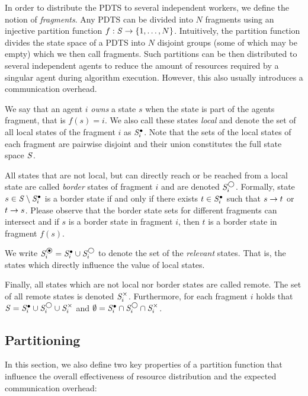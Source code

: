 In order to distribute the \ac{PDTS} to several independent workers, we define the notion of \emph{fragments}. Any \ac{PDTS} can be divided into $N$ fragments using an injective partition function $f: \mathit{S} \to \{1, \ldots, N \}$. Intuitively, the partition function divides the state space of a \ac{PDTS} into $N$ disjoint groups (some of which may be empty) which we then call fragments. Such partitions can be then distributed to several independent agents to reduce the amount of resources required by a singular agent during algorithm execution. However, this also usually introduces a communication overhead. 

We say that an agent $i$ \emph{owns} a state $s$ when the state is part of the agents fragment, that is $f(s) = i$. We also call these states \emph{local} and denote the set of all local states of the fragment $i$ as $\mathit{S}^\bullet_i$. Note that the sets of the local states of each fragment are pairwise disjoint and their union constitutes the full state space $\mathit{S}$. 

All states that are not local, but can directly reach or be reached from a local state are called \emph{border} states of fragment $i$ and are denoted $\mathit{S}^\bigcirc_i$. Formally, state $s \in \mathit{S} \setminus \mathit{S}^\bullet_i$ is a border state if and only if there exists $t \in \mathit{S}^\bullet_i$ such that $s \rightarrow t$ or $t \rightarrow s$. Please observe that the border state sets for different fragments can intersect and if $s$ is a border state in fragment $i$, then $t$ is a border state in fragment $f(s)$.

We write $\dtsSrelevant_i = \dtsSlocal_i \cup \dtsSborder_i$ to denote the set of the \emph{relevant} states. That is, the states which directly influence the value of local states.

Finally, all states which are not local nor border states are called remote. The set of all remote states is denoted $\mathit{S}^\times_i$. Furthermore, for each fragment $i$ holds that $\mathit{S} = \mathit{S}^\bullet_i \cup \mathit{S}^\bigcirc_i \cup \mathit{S}^\times_i$ and $\emptyset = \mathit{S}^\bullet_i \cap \mathit{S}^\bigcirc_i \cap \mathit{S}^\times_i$.

\subsection{Partitioning}

In this section, we also define two key properties of a partition function that influence the overall effectiveness of resource distribution and the expected communication overhead:

